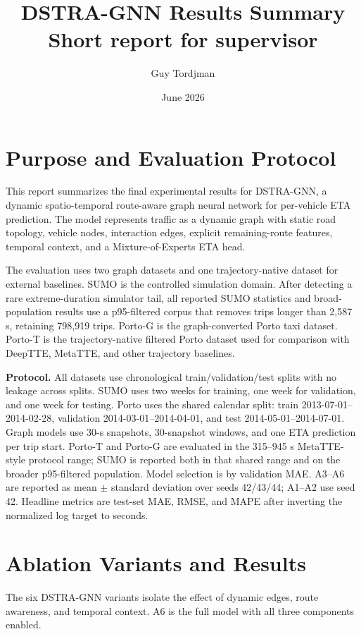\documentclass[10pt,a4paper]{article}
\title{\vspace{-1.3em}\textbf{DSTRA-GNN Results Summary}\\[-0.2em]
\large Short report for supervisor}
\author{Guy Tordjman}
\date{June 2026}
\begin{document}
\maketitle
\vspace{-1.8em}

\section{Purpose and Evaluation Protocol}

This report summarizes the final experimental results for DSTRA-GNN, a dynamic spatio-temporal route-aware graph neural network for per-vehicle ETA prediction. The model represents traffic as a dynamic graph with static road topology, vehicle nodes, interaction edges, explicit remaining-route features, temporal context, and a Mixture-of-Experts ETA head.

The evaluation uses two graph datasets and one trajectory-native dataset for external baselines. SUMO is the controlled simulation domain. After detecting a rare extreme-duration simulator tail, all reported SUMO statistics and broad-population results use a p95-filtered corpus that removes trips longer than 2,587 s, retaining 798,919 trips. Porto-G is the graph-converted Porto taxi dataset. Porto-T is the trajectory-native filtered Porto dataset used for comparison with DeepTTE, MetaTTE, and other trajectory baselines.

\textbf{Protocol.} All datasets use chronological train/validation/test splits with no leakage across splits. SUMO uses two weeks for training, one week for validation, and one week for testing. Porto uses the shared calendar split: train 2013-07-01--2014-02-28, validation 2014-03-01--2014-04-01, and test 2014-05-01--2014-07-01. Graph models use 30-s snapshots, 30-snapshot windows, and one ETA prediction per trip start. Porto-T and Porto-G are evaluated in the 315--945 s MetaTTE-style protocol range; SUMO is reported both in that shared range and on the broader p95-filtered population. Model selection is by validation MAE. A3--A6 are reported as mean $\pm$ standard deviation over seeds 42/43/44; A1--A2 use seed 42. Headline metrics are test-set MAE, RMSE, and MAPE after inverting the normalized log target to seconds.

\section{Ablation Variants and Results}

The six DSTRA-GNN variants isolate the effect of dynamic edges, route awareness, and temporal context. A6 is the full model with all three components enabled.
\end{document}
